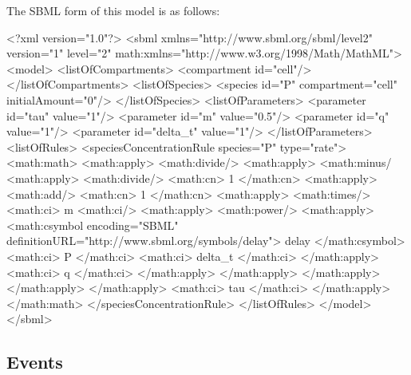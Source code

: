 \documentclass[10pt,twocolumntoc]{cekarticle}
\begin{document}
The SBML form of this model is as follows:
\begin{example}
<?xml version="1.0"?>
<sbml xmlns="http://www.sbml.org/sbml/level2" version="1" level="2"
      math:xmlns="http://www.w3.org/1998/Math/MathML">
    <model>
        <listOfCompartments>
            <compartment id="cell"/>
        </listOfCompartments>
        <listOfSpecies>
            <species id="P" compartment="cell" initialAmount="0"/>
        </listOfSpecies>
        <listOfParameters>
            <parameter id="tau" value="1"/>
            <parameter id="m" value="0.5"/>
            <parameter id="q" value="1"/>
            <parameter id="delta_t" value="1"/>
        </listOfParameters>
        <listOfRules>
            <speciesConcentrationRule species="P" type="rate">
                <math:math>
                 <math:apply>
                  <math:divide/>
                  <math:apply>
                   <math:minus/
                   <math:apply>
                    <math:divide/>
                    <math:cn> 1 </math:cn>
                    <math:apply>
                     <math:add/>
                     <math:cn> 1 </math:cn>
                     <math:apply>
                      <math:times/>
                      <math:ci> m <math:ci/>
                      <math:apply>
                       <math:power/>
                       <math:apply>
                        <math:csymbol encoding="SBML"
    definitionURL="http://www.sbml.org/symbols/delay">
                            delay
                        </math:csymbol>
                        <math:ci> P </math:ci>
                        <math:ci> delta_t </math:ci>
                       </math:apply>
                       <math:ci> q </math:ci>
                      </math:apply>
                     </math:apply>
                    </math:apply>
                   </math:apply>
                  </math:apply>
                  <math:ci> tau </math:ci>
                 </math:apply>
                </math:math>
            </speciesConcentrationRule>
        </listOfRules>
    </model>
</sbml>
\end{example}

\subsection{Events}
\label{sec:events}
\end{document}
